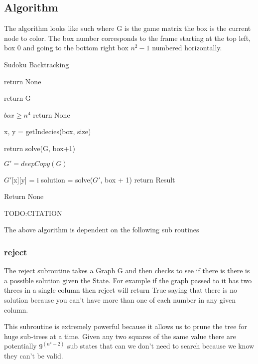 \documentclass{sig-alternate}
\begin{document}
\subsection{Algorithm}
The algorithm looks like such where G is the game matrix the box is the current node to color. The box number corresponds to the frame starting at the top left, box 0 and going to the bottom right box $n^2 - 1$ numbered horizontally.

\begin{algorithm}
\caption{Sudoku Backtracking}\label{solve}
\begin{algorithmic}[1]

\State return None
\EndIf

\State return G
\EndIf

\If $box \ge n^4$
\State return None
\EndIf

\State x, y = getIndecies(box, size)

\State return solve(G, box+1)
\EndIf

\State $G' = deepCopy(G)$

\State $G'$[x][y] = i
\State solution = solve($G'$, box + 1)
\State return Result
\EndIf
\EndFor

\State Return None
\EndProcedure
\end{algorithmic}
\end{algorithm}
TODO:CITATION

The above algorithm is dependent on the following sub routines

\subsubsection{reject}
The reject subroutine takes a Graph G and then checks to see if there is there is
a possible solution given the State. For example if the graph passed to it has two threes in a single column then reject will return True saying that there is no solution because you can't have more than one of each number in any given column. 

This subroutine is extremely powerful because it allows us to prune the tree for huge sub-trees at a time. Given any two squares of the same value there are potentially $9^(n^4 - 2)$ sub states that can we don't need to search because we know they can't be valid. 
\end{document}
